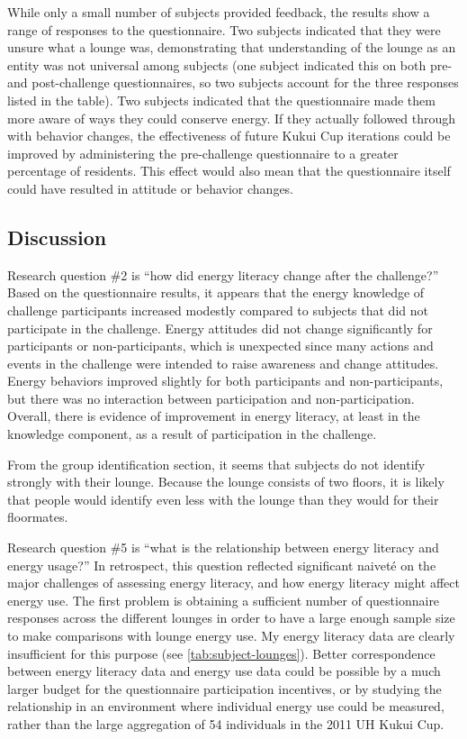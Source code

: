 While only a small number of subjects provided feedback, the results show a range of responses to the questionnaire. Two subjects indicated that they were unsure what a lounge was, demonstrating that understanding of the lounge as an entity was not universal among subjects (one subject indicated this on both pre- and post-challenge questionnaires, so two subjects account for the three responses listed in the table). Two subjects indicated that the questionnaire made them more aware of ways they could conserve energy. If they actually followed through with behavior changes, the effectiveness of future Kukui Cup iterations could be improved by administering the pre-challenge questionnaire to a greater percentage of residents. This effect would also mean that the questionnaire itself could have resulted in attitude or behavior changes.


\subsection{Discussion}

Research question \#2 is ``how did energy literacy change after the challenge?'' Based on the questionnaire results, it appears that the energy knowledge of challenge participants increased modestly compared to subjects that did not participate in the challenge. Energy attitudes did not change significantly for participants or non-participants, which is unexpected since many actions and events in the challenge were intended to raise awareness and change attitudes. Energy behaviors improved slightly for both participants and non-participants, but there was no interaction between participation and non-participation. Overall, there is evidence of improvement in energy literacy, at least in the knowledge component, as a result of participation in the challenge.

From the group identification section, it seems that subjects do not identify strongly with their lounge. Because the lounge consists of two floors, it is likely that people would identify even less with the lounge than they would for their floormates.

Research question \#5 is ``what is the relationship between energy literacy and energy usage?'' In retrospect, this question reflected significant naivet\'e on the major challenges of assessing energy literacy, and how energy literacy might affect energy use. The first problem is obtaining a sufficient number of questionnaire responses across the different lounges in order to have a large enough sample size to make comparisons with lounge energy use. My energy literacy data are clearly insufficient for this purpose (see \autoref{tab:subject-lounges}). Better correspondence between energy literacy data and energy use data could be possible by a much larger budget for the questionnaire participation incentives, or by studying the relationship in an environment where individual energy use could be measured, rather than the large aggregation of 54 individuals in the 2011 UH Kukui Cup.

